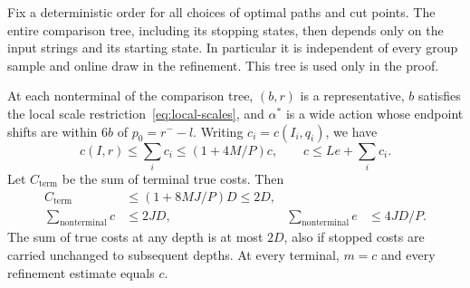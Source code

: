 Fix a deterministic order for all choices of optimal paths and cut points.
The entire comparison tree, including its stopping states, then depends only
on the input strings and its starting state.  In particular it is independent
of every group sample and online draw in the refinement.  This tree is used
only in the proof.

\begin{lemma}\label{lem:comparison-tree}
At each nonterminal of the comparison tree, $(b,r)$ is a representative,
$b$ satisfies the local scale restriction~\eqref{eq:local-scales}, and
$\alpha^*$ is a wide action whose endpoint shifts are within $6b$ of
$p_0=r^- -l$.  Writing $c_i=c(I_i,q_i)$, we have
\begin{equation}\label{eq:comparison-split}
 c(I,r)\le\sum_i c_i\le (1+4M/P)c,
 \qquad c\le Le+\sum_i c_i.
\end{equation}
Let $C_{\mathrm{term}}$ be the sum of terminal true costs.  Then
\begin{equation}\label{eq:comparison-totals}
 \begin{aligned}
 C_{\mathrm{term}}&\le(1+8MJ/P)D\le2D,\\
 \sum_{\mathrm{nonterminal}}c&\le2JD,
 &\sum_{\mathrm{nonterminal}}e&\le4JD/P.
 \end{aligned}
\end{equation}
The sum of true costs at any depth is at most $2D$, also if stopped costs are
carried unchanged to subsequent depths.  At every terminal, $m=c$ and every
refinement estimate equals $c$.
\end{lemma}

